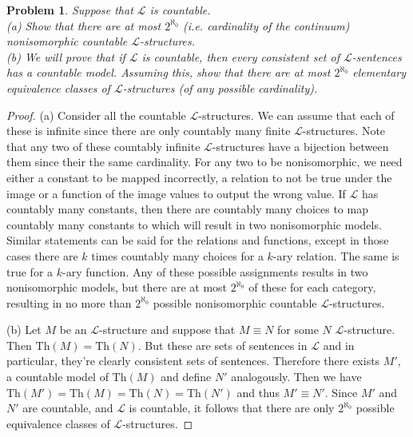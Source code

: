 \documentclass{article}
\newtheorem{problem}{Problem}
\begin{document}
\begin{problem}
Suppose that $\mathcal{L}$ is countable.\\
(a) Show that there are at most $2^{\aleph_0}$ (i.e. cardinality of the continuum) nonisomorphic countable $\mathcal{L}$-structures.\\
(b) We will prove that if $\mathcal{L}$ is countable, then every consistent set of $\mathcal{L}$-sentences has a countable model. Assuming this, show that there are at most $2^{\aleph_0}$ elementary equivalence classes of $\mathcal{L}$-structures (of any possible cardinality).
\end{problem}
\begin{proof}
(a) Consider all the countable $\mathcal{L}$-structures. We can assume that each of these is infinite since there are only countably many finite $\mathcal{L}$-structures. Note that any two of these countably infinite $\mathcal{L}$-structures have a bijection between them since their the same cardinality. For any two to be nonisomorphic, we need either a constant to be mapped incorrectly, a relation to not be true under the image or a function of the image values to output the wrong value. If $\mathcal{L}$ has countably many constants, then there are countably many choices to map countably many constants to which will result in two nonisomorphic models. Similar statements can be said for the relations and functions, except in those cases there are $k$ times countably many choices for a $k$-ary relation. The same is true for a $k$-ary function. Any of these possible assignments results in two nonisomorphic models, but there are at most $2^{\aleph_0}$ of these for each category, resulting in no more than $2^{\aleph_0}$ possible nonisomorphic countable $\mathcal{L}$-structures.

(b) Let $M$ be an $\mathcal{L}$-structure and suppose that $M \equiv N$ for some $N$ $\mathcal{L}$-structure. Then $\text{Th}(M) = \text{Th}(N)$. But these are sets of sentences in $\mathcal{L}$ and in particular, they're clearly consistent sets of sentences. Therefore there exists $M'$, a countable model of $\text{Th}(M)$ and define $N'$ analogously. Then we have $\text{Th}(M') = \text{Th}(M) = \text{Th}(N) = \text{Th}(N')$ and thus $M' \equiv N'$. Since $M'$ and $N'$ are countable, and $\mathcal{L}$ is countable, it follows that there are only $2^{\aleph_0}$ possible equivalence classes of $\mathcal{L}$-structures.
\end{proof}
\end{document}
